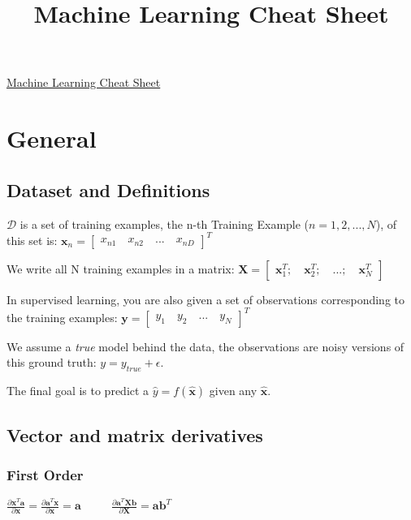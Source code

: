 \documentclass[10pt,a4paper,landscape]{article}
\renewcommand{\bf}[1]{\ensuremath{\mathbf{#1}}}
\begin{document}
\title{Machine Learning Cheat Sheet}

\raggedright
\footnotesize
\sffamily
\begin{multicols*}{4}

\setlength{\premulticols}{1pt}
\setlength{\postmulticols}{1pt}
\setlength{\multicolsep}{1pt}
\setlength{\columnsep}{2pt}

\begin{center}
\Large{\underline{Machine Learning Cheat Sheet}}
\end{center}

\section{General}
\subsection{Dataset and Definitions}
$\mathcal{D}$ is a set of training examples, the n-th Training Example ($n = 1,2, ..., N$), of this set is: $\bf{x}_n = \begin{bmatrix} x_{n1} \quad x_{n2} \quad ... \quad x_{nD} \end{bmatrix}^T$

We write all N training examples in a matrix: $\bf{X} = \begin{bmatrix} \bf{x}_1^T ; \quad \bf{x}_2^T ; \quad ... ; \quad \bf{x}_N^T \end{bmatrix}$

In supervised learning, you are also given a set of observations corresponding to the training examples:  $\bf{y} = \begin{bmatrix} y_1 \quad y_2 \quad ... \quad y_{N} \end{bmatrix}^T$

We assume a \emph{true} model behind the data, the observations are noisy versions of this ground truth: $y = y_{true} + \epsilon$.

The final goal is to predict a $\hat{y} = f(\bf{\hat{x}})$ given any $\bf{\hat{x}}$.

\subsection{Vector and matrix derivatives}
\subsubsection{First Order}
$\frac{\partial\bf{x}^T\bf{a}}{\partial\bf{x}} = \frac{\partial\bf{a}^T\bf{x}}{\partial\bf{x}} = \bf{a}$
$\quad\quad$
$\frac{\partial\bf{a}^T\bf{X}\bf{b}}{\partial\bf{X}} = \bf{ab}^T$


\end{multicols*}
\end{document}
